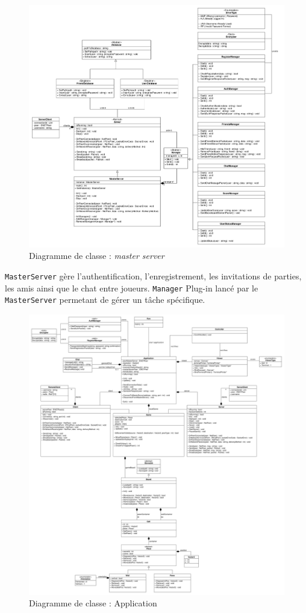\documentclass[a4paper,10pt]{article}
\newcommand{\cmd}{\texttt}
\begin{document}
\begin{figure}[H]
	\includegraphics[width=7in]{class/master-server.pdf}
	\caption{Diagramme de classe :\textit{ master server}}
	
\end{figure}
\cmd{MasterServer} gère l'authentification, l'enregistrement, les invitations de parties, les amis ainsi que le chat entre joueurs.
\cmd{Manager} Plug-in lancé par le \cmd{MasterServer} permetant de gérer un tâche spécifique.
\begin{figure}[H]
	\includegraphics[width=7in]{class/application.pdf}
	\caption{Diagramme de classe : Application}
\end{figure}
\end{document}
